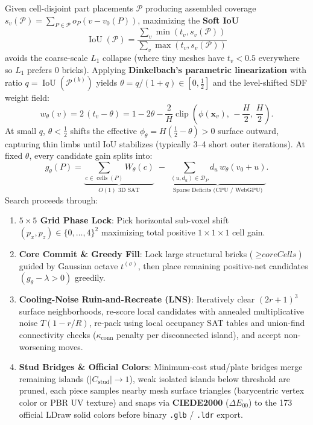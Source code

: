 \documentclass[11pt,twoside]{article}
\newcommand{\code}[1]{\texttt{#1}}
\begin{document}
Given cell-disjoint part placements $\mathcal{P}$ producing assembled coverage $s_v(\mathcal{P}) = \sum_{P\in\mathcal{P}} o_P(v - v_0(P))$, maximizing the \textbf{Soft IoU}
\begin{equation}
  \operatorname{IoU}(\mathcal{P}) = \frac{\sum_v \min(t_v, s_v(\mathcal{P}))}{\sum_v \max(t_v, s_v(\mathcal{P}))}
\end{equation}
avoids the coarse-scale $L_1$ collapse (where tiny meshes have $t_v < 0.5$ everywhere so $L_1$ prefers 0 bricks). Applying \textbf{Dinkelbach's parametric linearization} with ratio $q = \operatorname{IoU}(\mathcal{P}^{(k)})$ yields $\theta = q / (1 + q) \in [0, \tfrac{1}{2}]$ and the level-shifted SDF weight field:
\begin{equation}
  w_\theta(v) = 2\,(t_v - \theta) = 1 - 2\theta - \frac{2}{H}\operatorname{clip}\!\left(\phi(\mathbf{x}_v),\, -\frac{H}{2},\, \frac{H}{2}\right).
\end{equation}
At small $q$, $\theta < \tfrac{1}{2}$ shifts the effective $\phi_\theta = H(\tfrac{1}{2} - \theta) > 0$ surface outward, capturing thin limbs until IoU stabilizes (typically 3--4 short outer iterations). At fixed $\theta$, every candidate gain splits into:
\begin{equation}
  g_\theta(P) = \underbrace{\sum_{c\in\operatorname{cells}(P)} W_\theta(c)}_{O(1)\text{ 3D SAT}} \;-\; \underbrace{\sum_{(u, d_u)\in\mathcal{D}_P} d_u\, w_\theta(v_0 + u)}_{\text{Sparse Deficits (CPU / WebGPU)}}.
\end{equation}
Search proceeds through:
\begin{enumerate}[leftmargin=*,nosep]
  \item \textbf{$5\times 5$ Grid Phase Lock}: Pick horizontal sub-voxel shift $(p_x, p_z) \in \{0,\dots,4\}^2$ maximizing total positive $1\times 1\times 1$ cell gain.
  \item \textbf{Core Commit \& Greedy Fill}: Lock large structural bricks ($\ge \textit{coreCells}$) guided by Gaussian octave $t^{(\sigma)}$, then place remaining positive-net candidates $(g_\theta - \lambda > 0)$ greedily.
  \item \textbf{Cooling-Noise Ruin-and-Recreate (LNS)}: Iteratively clear $(2r+1)^3$ surface neighborhoods, re-score local candidates with annealed multiplicative noise $T(1 - r/R)$, re-pack using local occupancy SAT tables and union-find connectivity checks ($\kappa_{\text{conn}}$ penalty per disconnected island), and accept non-worsening moves.
  \item \textbf{Stud Bridges \& Official Colors}: Minimum-cost stud/plate bridges merge remaining islands ($|C_{\text{stud}}| \to 1$), weak isolated islands below threshold are pruned, each piece samples nearby mesh surface triangles (barycentric vertex color or PBR UV texture) and snaps via \textbf{CIEDE2000} ($\Delta E_{00}$) to the 173 official LDraw solid colors before binary \code{.glb} / \code{.ldr} export.
\end{enumerate}
\end{document}
